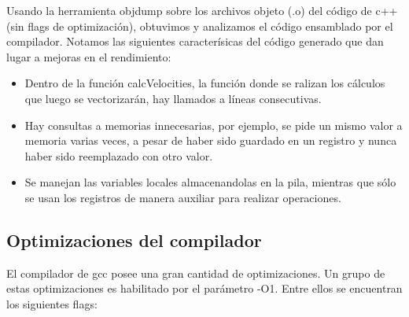 Usando la herramienta objdump sobre los archivos objeto (.o) del código de c++ (sin flags de optimización), obtuvimos y analizamos el código ensamblado por el compilador. Notamos las siguientes caracterísicas del código generado que dan lugar a mejoras en el rendimiento:
\begin{itemize}
	\item Dentro de la función calcVelocities, la función donde se ralizan los cálculos que luego se vectorizarán, hay llamados a líneas consecutivas.
	\item Hay consultas a memorias innecesarias, por ejemplo, se pide un mismo valor a memoria varias veces, a pesar de haber sido guardado en un registro y nunca haber sido reemplazado con otro valor.
	\item Se manejan las variables locales almacenandolas en la pila, mientras que sólo se usan los registros de manera auxiliar para realizar operaciones.
\end{itemize}


\subsection{Optimizaciones del compilador}

El compilador de gcc posee una gran cantidad de optimizaciones. Un grupo de estas optimizaciones es habilitado por el parámetro -O1. Entre ellos se encuentran los siguientes flags:




    

            

